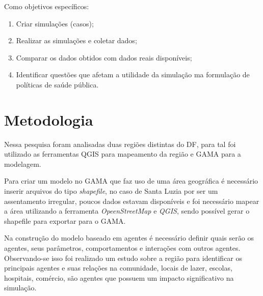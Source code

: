 Como objetivos específicos: 
\begin{enumerate}
\item Criar simulações (casos);
\item Realizar as simulações e coletar dados;
\item Comparar os dados obtidos com dados reais disponíveis;
\item Identificar questões que afetam a utilidade da simulação ma formulação de políticas de saúde pública.


\end{enumerate}
\section{Metodologia}%

Nessa pesquisa foram analisadas duas regiões distintas do DF, para tal foi utilizado as ferramentas QGIS para mapeamento da região e GAMA para a modelagem. 

Para criar um modelo no GAMA que faz uso de uma área geográfica é necessário inserir arquivos do tipo \textit{shapefile}, no caso de Santa Luzia por ser um assentamento irregular, poucos dados estavam disponíveis e foi necessário mapear a área utilizando a ferramenta \textit{OpeenStreetMap} e \textit{QGIS}, sendo possível gerar o shapefile para exportar para o GAMA.

Na construção do modelo baseado em agentes é necessário definir quais serão os agentes, seus parâmetros, comportamentos e interações com outros agentes. Observando-se isso foi realizado um estudo sobre a região para identificar os principais agentes e suas relações na comunidade, locais de lazer, escolas, hospitais, comércio, são agentes que possuem um impacto significativo na simulação.

